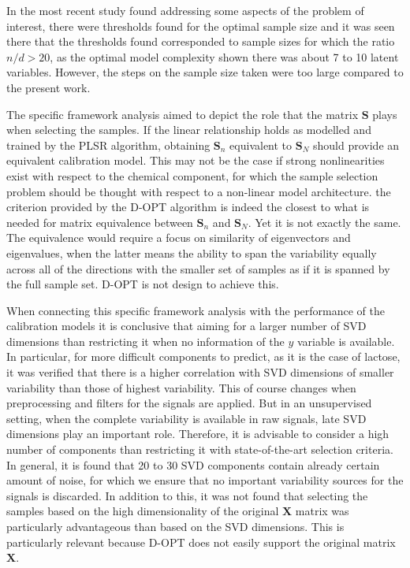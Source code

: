 \documentclass[journal=ancham,manuscript=article]{achemso}
\begin{document}
In the most recent study found addressing some aspects of the problem of interest, there were thresholds found for the optimal sample size and it was seen there that the thresholds found corresponded to sample sizes for which the ratio $n/d>20$, as the optimal model complexity shown there was about 7 to 10 latent variables. However, the steps on the sample size taken were too large compared to the present work. 

The specific framework analysis aimed to depict the role that the matrix $\mathbf{S}$ plays when selecting the samples. If the linear relationship holds as modelled and trained by the PLSR algorithm, obtaining $\mathbf{S}_n$ equivalent to $\mathbf{S}_N$ should provide an equivalent calibration model. This may not be the case if strong nonlinearities exist with respect to the chemical component, for which the sample selection problem should be thought with respect to a non-linear model architecture. the criterion provided by the D-OPT algorithm is indeed the closest to what is needed for matrix equivalence between $\mathbf{S}_n$ and $\mathbf{S}_N$. Yet it is not exactly the same. The equivalence would require a focus on similarity of eigenvectors and eigenvalues, when the latter means the ability to span the variability equally across all of the directions with the smaller set of samples as if it is spanned by the full sample set. D-OPT is not design to achieve this.

When connecting this specific framework analysis with the performance of the calibration models it is conclusive that aiming for a larger number of SVD dimensions than restricting it when no information of the $y$ variable is available. In particular, for more difficult components to predict, as it is the case of lactose, it was verified that there is a higher correlation with SVD dimensions of smaller variability than those of highest variability. This of course changes when preprocessing and filters for the signals are applied. But in an unsupervised setting, when the complete variability is available in raw signals, late SVD dimensions play an important role. Therefore, it is advisable to consider a high number of components than restricting it with state-of-the-art selection criteria. In general, it is found that 20 to 30 SVD components contain already certain amount of noise, for which we ensure that no important variability sources for the signals is discarded. In addition to this, it was not found that selecting the samples based on the high dimensionality of the original $\mathbf{X}$ matrix was particularly advantageous than based on the SVD dimensions. This is particularly relevant because D-OPT does not easily support the original matrix $\mathbf{X}$.
\end{document}
